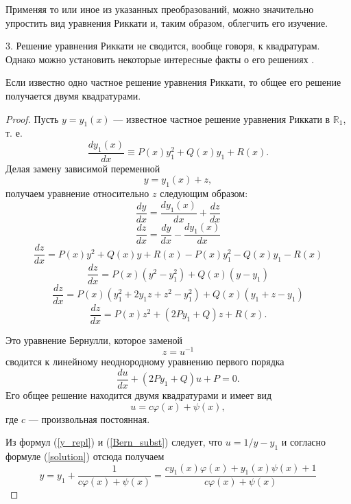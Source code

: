 Применяя то или иное из указанных преобразований, можно значительно упростить вид уравнения Риккати и, таким образом, облегчить его изучение.

$3.$ Решение уравнения Риккати не сводится, вообще говоря, к квадратурам. Однако можно установить некоторые интересные факты о его решениях \cite{egorov}.

\begin{theorem} \label{t1}
    Если известно одно частное решение уравнения Риккати, то общее его решение получается двумя квадратурами.
\end{theorem}
\begin{proof}
    Пусть $y=y_1(x)$ --- известное частное решение уравнения Риккати в $\mathbb{R}_1$, т. е.
    \begin{equation} \label{particular_solution_subst}
        \dfrac{dy_1(x)}{dx} \equiv P(x) y_1^2 + Q(x) y_1 + R(x).
    \end{equation}
    Делая замену зависимой переменной
    \begin{equation} \label{y_repl}
        y = y_1(x) + z,
    \end{equation}
    получаем уравнение относительно $z$ следующим образом:
    $$\dfrac{dy}{dx} = \dfrac{dy_1(x)}{dx} + \dfrac{dz}{dx}$$
    $$\dfrac{dz}{dx} = \dfrac{dy}{dx} - \dfrac{dy_1(x)}{dx}$$
    $$\dfrac{dz}{dx} = P(x) y^2 + Q(x) y + R(x) - P(x) y_1^2 - Q(x) y_1 - R(x)$$
    $$\dfrac{dz}{dx} = P(x) \left( y^2 - y_1^2 \right) + Q(x) \left( y - y_1 \right)$$
    $$\dfrac{dz}{dx} = P(x) \left( y_1^2 + 2 y_1 z + z^2 - y_1^2 \right) + Q(x) \left( y_1 + z - y_1 \right)$$
    $$\dfrac{dz}{dx} = P(x) z^2 + \left( 2 P y_1 + Q \right) z + R(x).$$
    
    Это уравнение Бернулли, которое заменой
    \begin{equation} \label{Bern_subst}
        z = u^{-1}
    \end{equation}
    сводится к линейному неоднородному уравнению первого порядка
    \begin{equation} \label{linear_heterog_eq_first_order}
        \dfrac{du}{dx} + \left( 2 P y_1 + Q \right) u + P = 0.
    \end{equation}
    Его общее решение находится двумя квадратурами и имеет вид
    \begin{equation} \label{solution}
        u = c \varphi(x) + \psi(x),
    \end{equation}
    где $c$ --- произвольная постоянная.

    Из формул (\ref{y_repl}) и (\ref{Bern_subst}) следует, что $u = 1/y - y_1$ и согласно формуле (\ref{solution}) отсюда получаем
    $$y = y_1 + \dfrac{1}{c \varphi(x) + \psi(x)} = \dfrac{c y_1(x) \varphi (x) + y_1(x) \psi (x) + 1}{c \varphi(x) + \psi(x)}$$
\end{proof}


